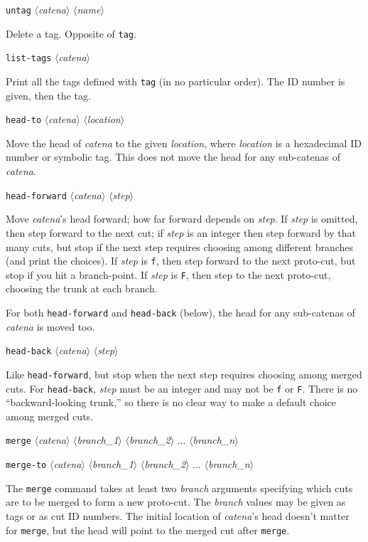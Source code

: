 \documentclass[10pt]{article}
\newcommand{\squote}[1]{{\tt\textquotesingle#1\textquotesingle}}
\newcommand{\itarg}[1]{\textit{$\langle$#1$\rangle$}}
\begin{document}
{{\tt untag} \itarg{catena} \itarg{name}
\begin{hang}
Delete a tag. Opposite of {\tt tag}.
\end{hang}

{\tt list-tags} \itarg{catena}
\begin{hang}
Print all the tags defined with {\tt tag} (in no particular
order). The ID number is given, then the tag.
\end{hang}

{\tt head-to} \itarg{catena} \itarg{location}
\begin{hang}
Move the head of {\it catena} to the given {\it location}, where 
{\it location} is a hexadecimal ID number or symbolic tag. This does
not move the head for any sub-catenas of {\it catena}.
\end{hang}

{\tt head-forward} \itarg{catena} \itarg{step}
\begin{hang}
Move {\it catena}'s head forward; how far forward depends on {\it step}.
If {\it step} is omitted, then step forward to the next cut; if 
{\it step} is an integer then step forward by that many cuts, but 
stop if the next step requires choosing among different branches (and
print the choices). If {\it step} is \squote{f}, then step forward to
the next proto-cut, but stop if you hit a branch-point. If {\it step}
is \squote{F}, then step to the next proto-cut, choosing the trunk at
each branch. 

For both {\tt head-forward} and {\tt head-back} (below), the head for any
sub-catenas of {\it catena} is moved too.
\end{hang}

{\tt head-back} \itarg{catena} \itarg{step}
\begin{hang}
Like {\tt head-forward}, but stop when the next step requires
choosing among merged cuts. For {\tt head-back}, {\it step} must be an
integer and may not be \squote{f} or \squote{F}. There is no
``backward-looking trunk,'' so there is no clear way to make a default
choice among merged cuts.
\end{hang}

{\tt merge} \itarg{catena} \itarg{branch\_1} \itarg{branch\_2}
... \itarg{branch\_n} 

{\tt merge-to} \itarg{catena} \itarg{branch\_1} \itarg{branch\_2} ... \itarg{branch\_n}
\begin{hang}
The {\tt merge} command takes at least two {\it branch} arguments
specifying which cuts are to be merged to form a new proto-cut. The
{\it branch} values may be given as tags or as cut ID numbers. The
initial location of {\it catena}'s head doesn't matter for {\tt merge},
but the head will point to the merged cut after {\tt merge}. 
  

\end{hang}}
\end{document}
